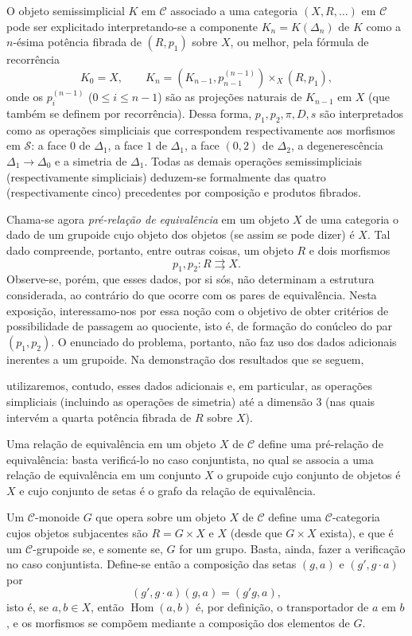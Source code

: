 \documentclass[11pt,twoside,openany]{book}
\numberwithin{equation}{section}
\newcommand{\src}[1]{%
  \phantomsection\hypertarget{src:#1}{}%
  \marginpar{\raggedleft\footnotesize\sffamily #1}%
}
\theoremstyle{plain}
\theoremstyle{definition}
\theoremstyle{remark}
\newcommand{\FgaUnitKey}{frontmatter}
\renewcommand{\src}[1]{%
  \phantomsection\hypertarget{src:\FgaUnitKey:#1}{}%
  \marginpar{\raggedleft\footnotesize\sffamily #1}%
}
\begin{document}
O objeto semissimplicial $K$ em $\mathcal C$ associado a uma categoria
$(X,R,\ldots)$ em $\mathcal C$ pode ser explicitado interpretando-se a
componente $K_n=K(\Delta_n)$ de $K$ como a $n$-ésima potência fibrada de
$(R,p_1)$ sobre $X$, ou melhor, pela fórmula de recorrência
\[
  K_0=X,\qquad
  K_n=(K_{n-1},p_{n-1}^{(n-1)})\times_X(R,p_1),
\]
onde os $p_i^{(n-1)}$ ($0\leq i\leq n-1$) são as projeções naturais de
$K_{n-1}$ em $X$ (que também se definem por recorrência). Dessa forma,
$p_1,p_2,\pi,D,s$ são interpretados como as operações simpliciais que
correspondem respectivamente aos morfismos em $\mathcal S$: a face $0$ de
$\Delta_1$, a face $1$ de $\Delta_1$, a face $(0,2)$ de $\Delta_2$, a
degenerescência $\Delta_1\to\Delta_0$ e a simetria de $\Delta_1$. Todas as
demais operações semissimpliciais (respectivamente simpliciais) deduzem-se
formalmente das quatro (respectivamente cinco) precedentes por composição e
produtos fibrados.

Chama-se agora \emph{pré-relação de equivalência} em um objeto $X$ de uma
categoria o dado de um grupoide cujo objeto dos objetos (se assim se pode
dizer) é $X$. Tal dado compreende, portanto, entre outras coisas, um objeto $R$
e dois morfismos
\[
  p_1,p_2:R\rightrightarrows X.
\]
Observe-se, porém, que esses dados, por si sós, não determinam a estrutura
considerada, ao contrário do que ocorre com os pares de equivalência. Nesta
exposição, interessamo-nos por essa noção com o objetivo de obter critérios de
possibilidade de passagem ao quociente, isto é, de formação do conúcleo do par
$(p_1,p_2)$. O enunciado do problema, portanto, não faz uso dos dados
adicionais inerentes a um grupoide. Na demonstração dos resultados que se
seguem,
\src{110}
utilizaremos, contudo, esses dados adicionais e, em particular, as operações
simpliciais (incluindo as operações de simetria) até a dimensão $3$ (nas quais
intervém a quarta potência fibrada de $R$ sobre $X$).

Uma relação de equivalência em um objeto $X$ de $\mathcal C$ define uma
pré-relação de equivalência: basta verificá-lo no caso conjuntista, no qual se
associa a uma relação de equivalência em um conjunto $X$ o grupoide cujo
conjunto de objetos é $X$ e cujo conjunto de setas é o grafo da relação de
equivalência.

Um $\mathcal C$-monoide $G$ que opera sobre um objeto $X$ de $\mathcal C$
define uma $\mathcal C$-categoria cujos objetos subjacentes são $R=G\times X$
e $X$ (desde que $G\times X$ exista), e que é um $\mathcal C$-grupoide se, e
somente se, $G$ for um grupo. Basta, ainda, fazer a verificação no caso
conjuntista. Define-se então a composição das setas $(g,a)$ e
$(g',g\cdot a)$ por
\[
  (g',g\cdot a)(g,a)=(g'g,a),
\]
isto é, se $a,b\in X$, então $\operatorname{Hom}(a,b)$ é, por definição, o
transportador de $a$ em $b$, e os morfismos se compõem mediante a composição
dos elementos de $G$.
\end{document}
